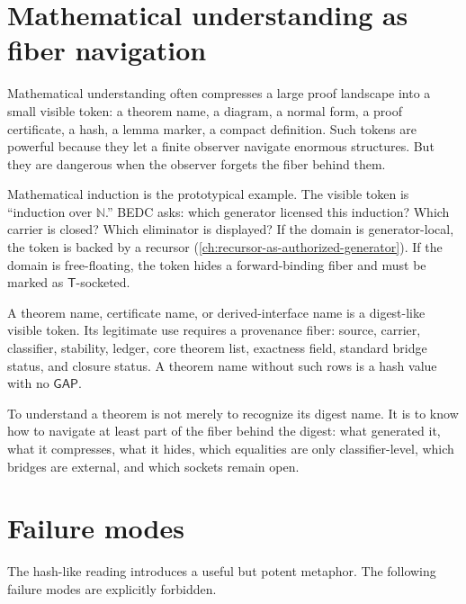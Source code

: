 \section{Mathematical understanding as fiber navigation}
\label{sec:hash-like-mathematical-understanding}

Mathematical understanding often compresses a large proof landscape into a small visible token: a theorem name, a diagram, a normal form, a proof certificate, a hash, a lemma marker, a compact definition. Such tokens are powerful because they let a finite observer navigate enormous structures. But they are dangerous when the observer forgets the fiber behind them.

Mathematical induction is the prototypical example. The visible token is ``induction over $\mathbb{N}$.'' BEDC asks: which generator licensed this induction? Which carrier is closed? Which eliminator is displayed? If the domain is generator-local, the token is backed by a recursor (\autoref{ch:recursor-as-authorized-generator}). If the domain is free-floating, the token hides a forward-binding fiber and must be marked as $\mathsf{T}$-socketed.

\begin{principle}
\label{prin:hash-like-theorem-names-digest-like}
A theorem name, certificate name, or derived-interface name is a digest-like visible token. Its legitimate use requires a provenance fiber: source, carrier, classifier, stability, ledger, core theorem list, exactness field, standard bridge status, and closure status. A theorem name without such rows is a hash value with no $\mathsf{GAP}$.
\end{principle}

\begin{remark}
\label{rem:hash-like-understanding-as-fiber}
To understand a theorem is not merely to recognize its digest name. It is to know how to navigate at least part of the fiber behind the digest: what generated it, what it compresses, what it hides, which equalities are only classifier-level, which bridges are external, and which sockets remain open.
\end{remark}

\section{Failure modes}
\label{sec:hash-like-failure-modes}

The hash-like reading introduces a useful but potent metaphor. The following failure modes are explicitly forbidden.

